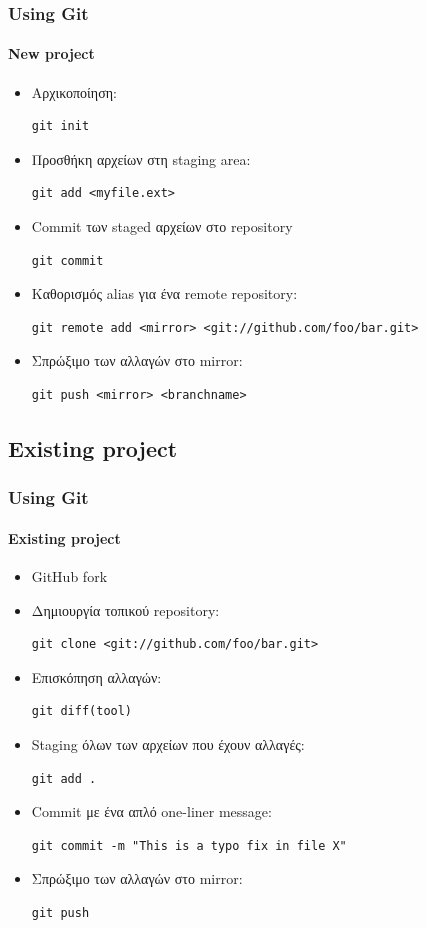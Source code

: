 \documentclass[]{beamer}
\begin{document}
\begin{frame}[fragile]
  \frametitle{Using Git}
  \framesubtitle{New project}
  \begin{itemize}
    \item Αρχικοποίηση:
\begin{verbatim}
git init
\end{verbatim}
    \item Προσθήκη αρχείων στη staging area:
\begin{verbatim}
git add <myfile.ext>
\end{verbatim}
    \item Commit των staged αρχείων στο repository
\begin{verbatim}
git commit
\end{verbatim}
    \item Καθορισμός alias για ένα remote repository:
\begin{verbatim}
git remote add <mirror> <git://github.com/foo/bar.git>
\end{verbatim}
    \item Σπρώξιμο των αλλαγών στο mirror:
\begin{verbatim}
git push <mirror> <branchname>
\end{verbatim}
  \end{itemize}
\end{frame}

\subsection{Existing project}

\begin{frame}[fragile]
  \frametitle{Using Git}
  \framesubtitle{Existing project}
  \begin{itemize}
    \item GitHub fork
    \item Δημιουργία τοπικού repository:
\begin{verbatim}
git clone <git://github.com/foo/bar.git>
\end{verbatim}
    \item Επισκόπηση αλλαγών:
\begin{verbatim}
git diff(tool)
\end{verbatim}
    \item Staging όλων των αρχείων που έχουν αλλαγές:
\begin{verbatim}
git add .
\end{verbatim}
    \item Commit με ένα απλό one-liner message:
\begin{verbatim}
git commit -m "This is a typo fix in file X"
\end{verbatim}
    \item Σπρώξιμο των αλλαγών στο mirror:
\begin{verbatim}
git push
\end{verbatim}
  \end{itemize}
\end{frame}
\end{document}
